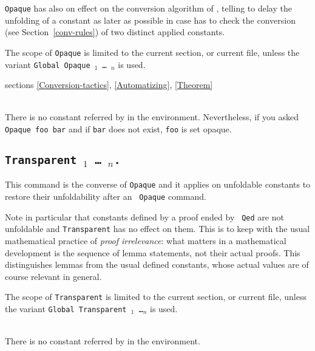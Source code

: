 {\tt Opaque} has also on effect on the conversion algorithm of {\Coq},
telling to delay the unfolding of a constant as later as possible in
case {\Coq} has to check the conversion (see Section~\ref{conv-rules})
of two distinct applied constants.

The scope of {\tt Opaque} is limited to the current section, or
current file, unless the variant {\tt Global Opaque \qualid$_1$ {\dots}
\qualid$_n$} is used.

\SeeAlso sections \ref{Conversion-tactics}, \ref{Automatizing},
\ref{Theorem}

\begin{ErrMsgs}
\item {}\\
    There is no constant referred by {\qualid} in the environment.
    Nevertheless, if you asked \texttt{Opaque foo bar}
    and if \texttt{bar} does not exist, \texttt{foo} is set opaque.
\end{ErrMsgs}

\subsection[\tt Transparent \qualid$_1$ {\dots} \qualid$_n$.]{\tt Transparent \qualid$_1$ {\dots} \qualid$_n$.\label{Transparent}}
This command is the converse of {\tt Opaque} and it applies on
unfoldable constants to restore their unfoldability after an {\tt
Opaque} command.

Note in particular that constants defined by a proof ended by {\tt
Qed} are not unfoldable and {\tt Transparent} has no effect on
them. This is to keep with the usual mathematical practice of {\em
proof irrelevance}: what matters in a mathematical development is the
sequence of lemma statements, not their actual proofs. This
distinguishes lemmas from the usual defined constants, whose actual
values are of course relevant in general.

The scope of {\tt Transparent} is limited to the current section, or
current file, unless the variant {\tt Global Transparent \qualid$_1$
\dots \qualid$_n$} is used.

\begin{ErrMsgs}
\item {}\\
    There is no constant referred by {\qualid} in the environment.
\end{ErrMsgs}


